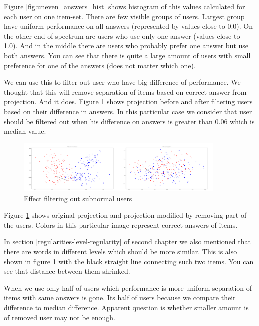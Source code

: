 \documentclass[
  digital, %
  table,   %
  nolof,     %
  nolot,     %
  nocover
]{fithesis3}
\begin{document}
Figure \ref{fig:uneven_answers_hist} shows histogram of this values calculated for each user on one item-set. There are few visible groups of users. Largest group have uniform performance on all answers (represented by values close to 0.0). On the other end of spectrum are users who use only one answer (values close to 1.0). And in the middle there are users who probably prefer one answer but use both answers. You can see that there is quite a large amount of users with small preference for one of the answers (does not matter which one).

We can use this to filter out user who have big difference of performance. We thought that this will remove separation of items based on correct answer from projection. And it does. Figure \ref{fig:answers_normalization} shows projection before and after filtering users based on their difference in answers. In this particular case we consider that user should be filtered out when his difference on answers is greater than 0.06 which is median value.

\begin{figure}
  \includegraphics[width=10cm]{img/answers_normalization}
  \caption{Effect filtering out subnormal users}
  \label{fig:answers_normalization}
\end{figure}


Figure \ref{fig:answers_normalization} shows original projection and projection modified by removing part of the users. Colors in this particular image represent correct answers of items. %

In section \ref{regularities-level-regularity} of second chapter we also mentioned that there are words in different levels which should be more similar. This is also shown in figure \ref{fig:answers_normalization} with the black straight line connecting such two items. You can see that distance between them shrinked.


When we use only half of users which performance is more uniform separation of items with same answers is gone. Its half of users because we compare their difference to median difference. Apparent question is whether smaller amount is of removed user may not be enough. %
\end{document}
